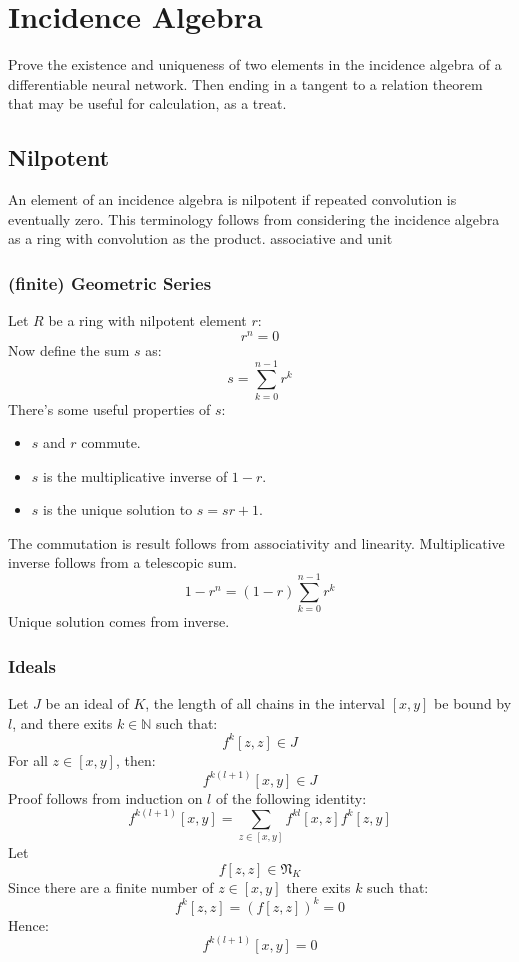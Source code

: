 
\chapter{Incidence Algebra}
Prove the existence and uniqueness of two elements in the incidence algebra of a differentiable neural network.
Then ending in a tangent to a relation theorem that may be useful for calculation, as a treat.

\section{Nilpotent}
An element of an incidence algebra is nilpotent if repeated convolution is eventually zero.
This terminology follows from considering the incidence algebra as a ring with convolution as the product.
associative and unit

\subsection{(finite) Geometric Series}
Let $R$ be a ring with nilpotent element $r$:
\[r^n=0\]
Now define the sum $s$ as:
\[s = \sum_{k=0}^{n-1}r^k\]
There's some useful properties of $s$:
\begin{itemize}
\item $s$ and $r$ commute.
\item $s$ is the multiplicative inverse of $1-r$.
\item $s$ is the unique solution to $s=sr+1$.
\end{itemize}
The commutation is result follows from associativity and linearity.
Multiplicative inverse follows from a telescopic sum.
\[1-r^n = (1-r)\sum_{k=0}^{n-1}r^k\]
Unique solution comes from inverse.

\subsection{Ideals}
Let $J$ be an ideal of $K$,
the length of all chains in the interval $[x,y]$ be bound by $l$,
and there exits $k\in \mathbb{N}$ such that:
\[f^k[z,z]\in J\]
For all $z\in[x,y]$, then:
\[f^{k(l+1)}[x,y]\in J\]
Proof follows from induction on $l$ of the following identity:
\[f^{k(l+1)}[x,y] = \sum_{z\in[x,y]}f^{kl}[x,z]f^k[z,y]\]
Let 
\[f[z,z]\in\mathfrak{N}_K\]
Since there are a finite number of $z\in[x,y]$ there exits $k$ such that:
\[f^k[z,z] = (f[z,z])^k = 0\]
Hence:
\[f^{k(l+1)}[x,y] = 0\]


